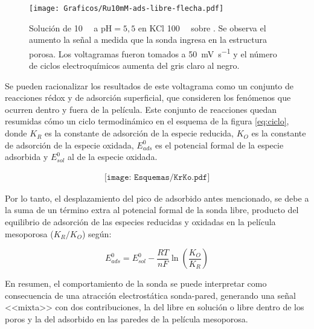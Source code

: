 				\begin{figure}[t]
				\centering
				\texttt{[image: Graficos/Ru10mM-ads-libre-flecha.pdf]}
		        \caption{Solución de \ru\space \SI{10}{\milli\Molar} a $\text{pH}=5,5$ en KCl \SI{100}{\milli\Molar} sobre \pdmF. Se observa el aumento la señal a medida que la sonda ingresa en la estructura porosa. Los voltagramas fueron tomados a \SI{50}{\milli\volt\per\second} y el número de ciclos electroquímicos aumenta del gris claro al negro.}
		        \label{fig:primero-Ru10mM}
		        \end{figure}

		Se pueden racionalizar los resultados de este voltagrama como un conjunto de reacciones rédox y de adsorción superficial, que consideren los fenómenos que ocurren dentro y fuera de la película. Este conjunto de reacciones quedan resumidas cómo un ciclo termodinámico en el esquema de la figura \ref{eq:ciclo}, donde $K_R$ es la constante de adsorción de la especie reducida, $K_O$ es la constante de adsorción de la especie oxidada, $E^0_{ads}$ es el potencial formal de la especie adsorbida y $E^0_{sol}$ al de la especie oxidada.\cite{ybarra2007}

				\begin{equation}
				\begin{aligned}
		 	    \texttt{[image: Esquemas/KrKo.pdf]}
		 	    \label{eq:ciclo}
		 	    \end{aligned}
		      	\end{equation}

		\noindent Por lo tanto, el desplazamiento del pico de \ru\space adsorbido antes mencionado, se debe a la suma de un término extra al potencial formal de la sonda libre, producto del equilibrio de adsorción de las especies reducidas y oxidadas en la película mesoporosa ($K_R/K_O$) según\cite{Wi2000}:

				\begin{equation}
				E^0_{ads} = E^0_{sol}-\frac{RT}{nF}\ln \left(\frac{K_O}{K_R}\right)
				\label{eq:kokreq}
				\end{equation}

		En resumen, el comportamiento de la sonda se puede interpretar como consecuencia de una atracción electrostática sonda-pared, generando una señal <<mixta>> con dos contribuciones, la del \ru\space libre en solución o libre dentro de los poros y la del \ru\space adsorbido en las paredes de la película mesoporosa.

